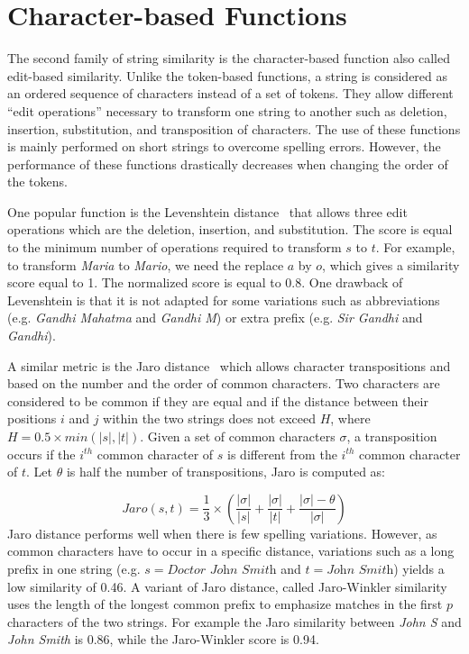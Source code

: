\section{Character-based Functions}

The second family of string similarity is the character-based function also called edit-based similarity. Unlike the token-based functions, a string is considered as an ordered sequence of characters instead of a set of tokens. They allow different ``edit operations'' necessary to transform one string to another such as deletion, insertion, substitution, and transposition of characters. The use of these functions is mainly performed on short strings to overcome spelling errors. However, the performance of these functions drastically decreases when changing the order of the tokens.

One popular function is the Levenshtein distance~\cite{Levenshtein:SPD66} that allows three edit operations which are the deletion, insertion, and substitution. The score is equal to the minimum number of operations required to transform $s$ to $t$. For example, to transform \textit{Maria} to \textit{Mario}, we need the replace $a$ by $o$, which gives a similarity score equal to 1. The normalized score is equal to 0.8. One drawback of Levenshtein is that it is not adapted for some variations such as abbreviations (e.g. \emph{Gandhi Mahatma} and \emph{Gandhi M}) or extra prefix (e.g. \emph{Sir Gandhi} and \emph{Gandhi}).

A similar metric is the Jaro distance~\cite{Jaro:JASA89} which allows character transpositions and based on the number and the order of common characters. Two characters are considered to be common if they are equal and if the distance between their positions $i$ and $j$ within the two strings does not exceed $H$, where $H=0.5 \times min(|s|,|t|)$. Given a set of common characters $\sigma$, a transposition occurs if the $i^{th}$ common character of $s$ is different from the $i^{th}$ common character of $t$. Let $\theta$ is half the number of transpositions, Jaro is computed as:

\begin{equation*}
		Jaro (s,t) =  \frac{1}{3} \times  \left(  \frac{|\sigma|}{|s|} +\frac{|\sigma|}{|t|} + \frac{|\sigma|-\theta}{|\sigma|} \right) 
\end{equation*}
Jaro distance performs well when there is few spelling variations. However, as common characters have to occur in a specific distance, variations such as a long prefix in one string (e.g. $s=\textit{Doctor John Smith}$ and $t=\textit{John Smith}$) yields a low similarity of 0.46. A variant of Jaro distance, called Jaro-Winkler similarity~\cite{Winkler:1999} uses the length of the longest common prefix to emphasize matches in the first $p$ characters of the two strings. For example the Jaro similarity between \textit{John S} and \textit{John Smith} is 0.86, while the Jaro-Winkler score is 0.94.

